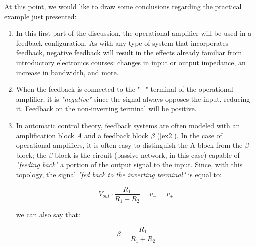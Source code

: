 \documentclass[../main.tex]{subfiles}
\begin{document}
At this point, we would like to draw some conclusions regarding the practical example just presented:

\begin{enumerate}[label=\textbf{-}]
	\item In this first part of the discussion, the operational amplifier will be used in a feedback configuration. As with any type of system that incorporates feedback, negative feedback will result in the effects already familiar from introductory electronics courses: changes in input or output impedance, an increase in bandwidth, and more.
	\item When the feedback is connected to the "$-$" terminal of the operational amplifier, it is \textit{"negative"} since the signal always opposes the input, reducing it. Feedback on the non-inverting terminal will be positive.
	\item In automatic control theory, feedback systems are often modeled with an amplification block $A$ and a feedback block $\beta$ (\autoref{ex2}). In the case of operational amplifiers, it is often easy to distinguish the A block from the $\beta$ block; the $\beta$ block is the circuit (passive network, in this case) capable of \textit{"feeding back"} a portion of the output signal to the input. Since, with this topology, the signal \textit{"fed back to the inverting terminal"} is equal to:
	
	\begin{equation}
		V_{out} \cdot \frac{R_1}{R_1 + R_2} = v_- = v_+
	\end{equation}
	
	we can also say that:
	
	\begin{equation}
		\beta = \frac{R_1}{R_1 + R_2}
	\end{equation}
	
	
	\begin{figure}[h]
	\begin{center}
	

\end{center}
\end{figure}
\end{enumerate}
\end{document}
